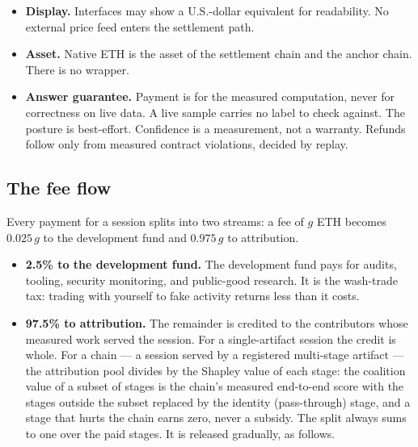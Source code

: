 \documentclass[11pt]{article}
\begin{document}
\begin{itemize}
campaign, which must spread its queries over as many epochs as
the budget allows.
\item \textbf{Display.} Interfaces may show a U.S.-dollar
equivalent for readability. No external price feed enters the
settlement path.
\item \textbf{Asset.} Native ETH is the asset of the settlement
chain and the anchor chain. There is no wrapper.
\item \textbf{Answer guarantee.} Payment is for the measured
computation, never for correctness on live data. A live sample
carries no label to check against. The posture is best-effort.
Confidence is a measurement, not a warranty. Refunds follow only
from measured contract violations, decided by replay.
\end{itemize}

\subsection{The fee flow}

Every payment for a session splits into two streams: a fee of
$g$ ETH becomes $0.025\,g$ to the development fund and
$0.975\,g$ to attribution.

\begin{itemize}
\item \textbf{2.5\% to the development fund.} The development
fund pays for audits, tooling, security monitoring, and
public-good research. It is the wash-trade tax: trading with
yourself to fake activity returns less than it costs.
\item \textbf{97.5\% to attribution.} The remainder is credited
to the contributors whose measured work served the session. For a
single-artifact session the credit is whole. For a chain --- a
session served by a registered multi-stage artifact --- the
attribution pool divides by the Shapley value of each stage:
the coalition value of a subset of stages is the chain's measured
end-to-end score with the stages outside the subset replaced by
the identity (pass-through) stage, and a stage that hurts the
chain earns zero, never a subsidy. The split always sums to one
over the paid stages. It is released gradually, as follows.
\end{itemize}
\end{document}
